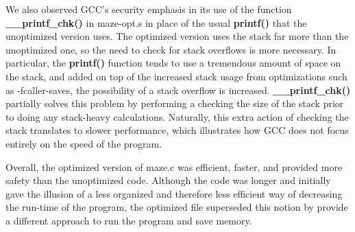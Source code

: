 \documentclass[12pt,letterpaper]{article}
\begin{document}
We also observed GCC’s security emphasis in its use of the function {\bf \_\_printf\_chk()} in maze-opt.s in place of the usual {\bf printf()} that the unoptimized version uses. The optimized version uses the stack far more than the unoptimized one, so the need to check for stack overflows is more necessary. In particular, the {\bf printf()} function tends to use a tremendous amount of space on the stack, and added on top of the increased stack usage from optimizations such as -fcaller-saves, the possibility of a stack overflow is increased. {\bf \_\_printf\_chk()} partially solves this problem by performing a checking the size of the stack prior to doing any stack-heavy calculations. Naturally, this extra action of checking the stack translates to slower performance, which illustrates how GCC does not focus entirely on the speed of the program.

Overall, the optimized version of maze.c was efficient, faster, and provided more safety than the unoptimized code. Although the code was longer and initially gave the illusion of a less organized and therefore less efficient way of decreasing the run-time of the program, the optimized file superseded this notion by provide a different approach to run the program and save memory.
\end{document}
